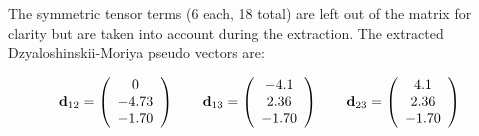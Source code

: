 \documentclass[12pt,a4paper]{report}
\numberwithin{equation}{section}
\begin{document}


%    


The symmetric tensor terms (6 each, 18 total) are left out of the matrix for clarity but are taken into account during the extraction.
The extracted Dzyaloshinskii-Moriya pseudo vectors are:

\[     \vb{d}_{12}=
    \left( \begin{array}{c}
    0  \\
    -4.73  \\
    -1.70
    \end{array} \right)
    \qquad
    \vb{d}_{13}=
    \left( \begin{array}{c}
    -4.1  \\
    2.36  \\
    -1.70
    \end{array} \right)
    \qquad    \vb{d}_{23}=
    \left( \begin{array}{c}
    4.1  \\
    2.36  \\
    -1.70
    \end{array} \right)
    \]
\end{document}
